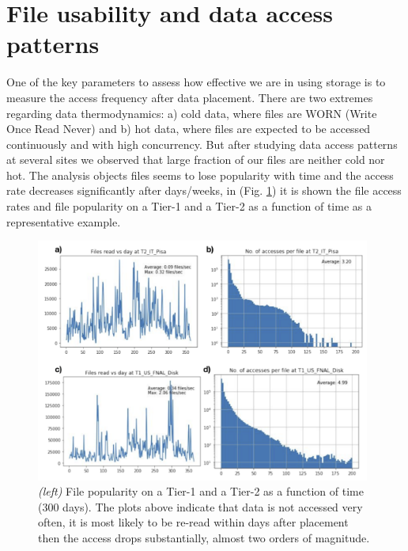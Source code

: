\section{File usability and data access patterns}
One of the key parameters to assess how effective we are in using storage is to measure the access frequency after data placement. There are two extremes regarding data thermodynamics: a) cold data, where files are WORN (Write Once Read Never) and b) hot data, where files are expected to be accessed continuously and with high concurrency. But after studying data access patterns at several sites we observed that large fraction of our files are neither cold nor hot. The analysis objects files seems to lose popularity with time and the access rate decreases significantly after days/weeks, in (Fig. \ref{access}) it is shown the file access rates and file popularity on a Tier-1 and a Tier-2 as a function of time as a representative example.

\begin{figure}[h]
  \centering
  \includegraphics[height=8cm]{dataaccess-chep2019.png}
  \caption{{\em (left)} File popularity on a Tier-1 and a Tier-2 as a function of time (300 days). The plots above indicate that data is not accessed very often, it is most likely to be re-read within days after placement then the access drops substantially, almost two orders of magnitude.}
  \label{access}
\end{figure}

